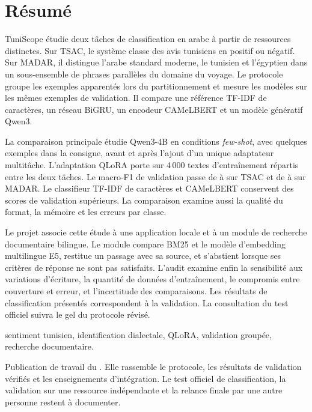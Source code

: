 \section*{Résumé}

TuniScope étudie deux tâches de classification en arabe à partir de ressources distinctes. Sur TSAC, le système classe des avis tunisiens en positif ou négatif. Sur MADAR, il distingue l’arabe standard moderne, le tunisien et l’égyptien dans un sous-ensemble de phrases parallèles du domaine du voyage. Le protocole groupe les exemples apparentés lors du partitionnement et mesure les modèles sur les mêmes exemples de validation. Il compare une référence TF-IDF de caractères, un réseau BiGRU, un encodeur CAMeLBERT et un modèle génératif Qwen3.

La comparaison principale étudie Qwen3-4B en conditions \emph{few-shot}, avec quelques exemples dans la consigne, avant et après l’ajout d’un unique adaptateur multitâche. L’adaptation QLoRA porte sur 4\,000 textes d’entraînement répartis entre les deux tâches. Le macro-F1 de validation passe de \QwenTsacBasePercent{} à \QwenTsacAdaptedPercent{} sur TSAC et de \QwenMadarBasePercent{} à \QwenMadarAdaptedPercent{} sur MADAR. Le classifieur TF-IDF de caractères et CAMeLBERT conservent des scores de validation supérieurs. La comparaison examine aussi la qualité du format, la mémoire et les erreurs par classe.

Le projet associe cette étude à une application locale et à un module de recherche documentaire bilingue. Le module compare BM25 et le modèle d’embedding multilingue E5, restitue un passage avec sa source, et s’abstient lorsque ses critères de réponse ne sont pas satisfaits. L’audit examine enfin la sensibilité aux variations d’écriture, la quantité de données d’entraînement, le compromis entre couverture et erreur, et l’incertitude des comparaisons. Les résultats de classification présentés correspondent à la validation. La consultation du test officiel suivra le gel du protocole révisé.

\smallskip
{}\quad sentiment tunisien, identification dialectale, QLoRA, validation groupée, recherche documentaire.

\vfill
\begin{center}
\setlength{\fboxsep}{11pt}
\colorbox{Wash}{\begin{minipage}{0.92\linewidth}
\par
\small Publication de travail du \ReportDate. Elle rassemble le protocole, les résultats de validation vérifiés et les enseignements d’intégration. Le test officiel de classification, la validation sur une ressource indépendante et la relance finale par une autre personne restent à documenter.
\end{minipage}}
\end{center}
